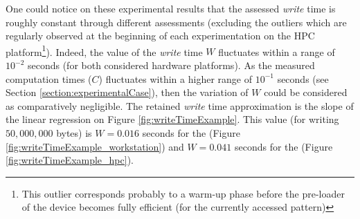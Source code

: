 		One could notice on these experimental results that the assessed \emph{write} time is roughly constant through different assessments (excluding the outliers which are regularly observed at the beginning of each experimentation on the HPC platform\footnote{This outlier corresponds probably to a warm-up phase before the pre-loader of the \notationIO\space device becomes fully efficient (for the currently accessed \notationIO\space pattern)}).   Indeed, the value of the \emph{write} time $W$ fluctuates within a range of $10 ^{-2}$ seconds (for both considered hardware platforms).   As the measured computation times ($C$) fluctuates within a higher range of $10^{-1}$ seconds (see Section \ref{section:experimentalCase}), then the variation of $W$ could be considered as comparatively negligible.   The retained \emph{write} time approximation is the slope of the linear regression on Figure \ref{fig:writeTimeExample}.   This value (for writing $50,000,000$ bytes) is $W=0.016$ seconds for the \targetPlatformLaptop\space (Figure \ref{fig:writeTimeExample_workstation}) and $W=0.041$ seconds for the \targetPlatformHpc\space (Figure \ref{fig:writeTimeExample_hpc}).\\

